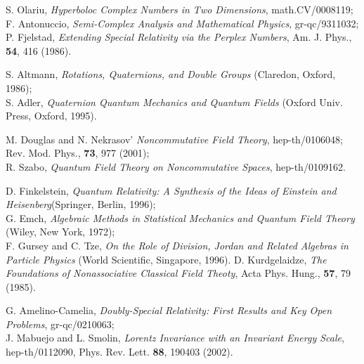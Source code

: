 \documentclass[a4paper,12pt]{article}
\begin{document}
\begin{thebibliography}{99}
 S. Olariu,
             {\it Hyperboloc Complex Numbers in Two Dimensions},
             math.CV/0008119; \\
          F. Antonuccio,
             {\it Semi-Complex Analysis and Mathematical Physics}, 
             gr-qc/9311032; \\
             P. Fjelstad,
             {\it Extending Special Relativity via the Perplex Numbers},
             Am. J. Phys., {\bf 54}, 416 (1986).

 S. Altmann,
            {\it Rotations, Quaternions, and Double Groups}
            (Claredon, Oxford, 1986); \\
            S. Adler,
            {\it Quaternion Quantum Mechanics and Quantum Fields}
            (Oxford Univ. Press, Oxford, 1995).

 M. Douglas and N. Nekrasov'
             {\it Noncommutative Field Theory},
             hep-th/0106048; Rev. Mod. Phys., {\bf 73}, 977 (2001); \\
             R. Szabo,
            {\it Quantum Field Theory on Noncommutative Spaces}, 
            hep-th/0109162.

 D. Finkelstein, 
              {\it Quantum Relativity: A Synthesis of the Ideas of Einstein and 
               Heisenberg}(Springer, Berlin, 1996);\\
               G. Emch, 
              {\it Algebraic Methods in Statistical Mechanics and Quantum Field 
              Theory}
              (Wiley, New York, 1972); \\
               F. Gursey and C. Tze,
               {\it On the Role of Division, Jordan and Related Algebras in 
               Particle Physics} (World Scientific, Singapore, 1996).
 D. Kurdgelaidze,
             {\it The Foundations of Nonassociative Classical Field Theoty},
             Acta Phys. Hung., {\bf 57}, 79 (1985).

 G. Amelino-Camelia,
             {\it Doubly-Special Relativity: First Results and Key Open 
             Problems}, gr-qc/0210063; \\
             J. Mabuejo and L. Smolin,
             {\it Lorentz Invariance with an Invariant Energy Scale},
             hep-th/0112090, Phys. Rev. Lett. {\bf 88}, 190403 (2002).

\end{thebibliography}
\end{document}
